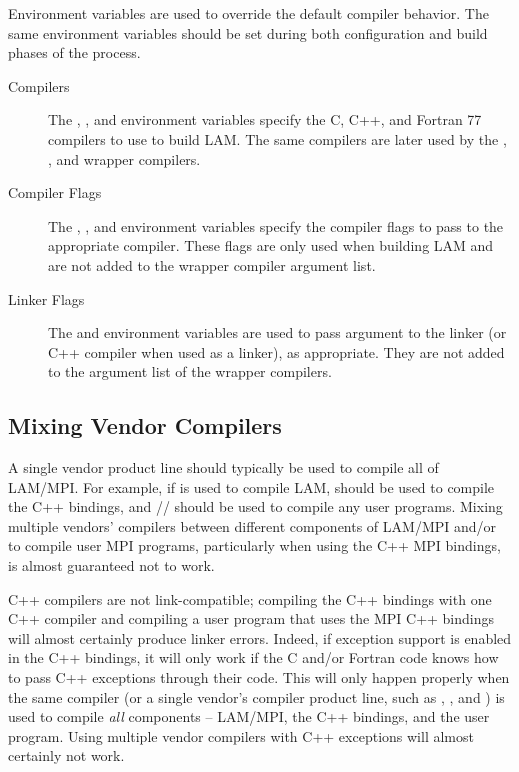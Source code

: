 Environment variables are used to override the default compiler
behavior.  The same environment variables should be set during both
configuration and build phases of the process.

\begin{description}

\item[Compilers] 
  
  The , , and  environment
  variables specify the C, C++, and Fortran 77 compilers to use to
  build LAM.  The same compilers are later used by the ,
  , and  wrapper compilers.

\item[Compiler Flags]
  
  The , , and 
  environment variables specify the compiler flags to pass to the
  appropriate compiler.  These flags are only used when building LAM
  and are not added to the wrapper compiler argument list.

\item[Linker Flags]
  
  The  and  environment variables
  are used to pass argument to the linker (or C++ compiler when used
  as a linker), as appropriate.  They are not added to the argument
  list of the wrapper compilers.

\end{description}


\subsection{Mixing Vendor Compilers}

A single vendor product line should typically be used to compile all
of LAM/MPI.  For example, if  is used to compile LAM,
 should be used to compile the C++ bindings, and
// should be used to compile any user
programs.  Mixing multiple vendors' compilers between different
components of LAM/MPI and/or to compile user MPI programs,
particularly when using the C++ MPI bindings, is almost guaranteed not
to work.

C++ compilers are not link-compatible; compiling the C++ bindings with
one C++ compiler and compiling a user program that uses the MPI C++
bindings will almost certainly produce linker errors.
%
Indeed, if exception support is enabled in the C++ bindings, it will
only work if the C and/or Fortran code knows how to pass C++
exceptions through their code.  This will only happen properly when
the same compiler (or a single vendor's compiler product line, such as
, , and ) is used to compile {\em all}
components -- LAM/MPI, the C++ bindings, and the user program.  Using
multiple vendor compilers with C++ exceptions will almost certainly
not work.

